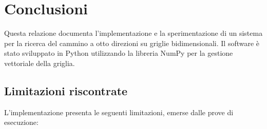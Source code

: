 \section{Conclusioni}

Questa relazione documenta l'implementazione e la sperimentazione di un sistema per la ricerca del cammino a otto direzioni su griglie bidimensionali. Il software è stato sviluppato in Python utilizzando la libreria NumPy per la gestione vettoriale della griglia.

\subsection{Limitazioni riscontrate}

L'implementazione presenta le seguenti limitazioni, emerse dalle prove di esecuzione:

